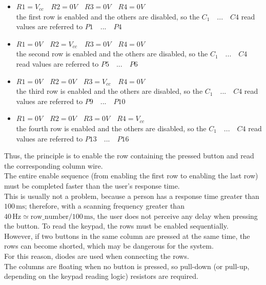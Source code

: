 \begin{itemize}

    \item \(R1 = V_{cc} \quad R2 = 0V \quad R3 = 0V \quad R4 = 0V\) \\
    the first row is enabled and the others are disabled, so the \(C_1 \quad ... \quad C4\) read values are referred to \(P1 \quad ...\quad P4\)

    \item \(R1 = 0V \quad R2 = V_{cc} \quad R3 = 0V \quad R4 = 0V\) \\
    the second row is enabled and the others are disabled, so the \(C_1 \quad ... \quad C4\) read values are referred to \(P5 \quad ...\quad P6\)
    
    \item \(R1 = 0V \quad R2 = 0V \quad R3 = V_{cc} \quad R4 = 0V\) \\
    the third row is enabled and the others are disabled, so the \(C_1 \quad ... \quad C4\) read values are referred to \(P9 \quad ...\quad P10\)
    
    \item \(R1 = 0V \quad R2 = 0V \quad R3 = 0V \quad R4 = V_{cc}\) \\
    the fourth row is enabled and the others are disabled, so the \(C_1 \quad ... \quad C4\) read values are referred to \(P13 \quad ...\quad P16\)
\end{itemize}

\noindent
Thus, the principle is to enable the row containing the pressed button and read the corresponding column wire. \\
The entire enable sequence (from enabling the first row to enabling the last row) must be completed faster than the user's response time. \\
This is usually not a problem, because a person has a response time greater than \(100 \, \mathrm{ms}\); therefore, with a scanning frequency greater than \(40 \, \mathrm{Hz} \simeq \text{row\_number}/100\,\mathrm{ms}\), the user does not perceive any delay when pressing the button.
To read the keypad, the rows must be enabled sequentially. \\
However, if two buttons in the same column are pressed at the same time, the rows can become shorted, which may be dangerous for the system. \\
For this reason, diodes are used when connecting the rows. \\
The columns are floating when no button is pressed, so pull-down (or pull-up, depending on the keypad reading logic) resistors are required.


